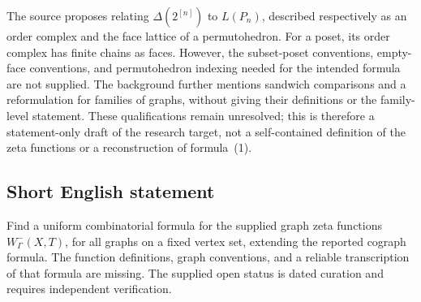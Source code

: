 \documentclass[11pt]{article}
\begin{document}
The source proposes relating \(\Delta(2^{[n]})\) to \(L(P_n)\), described respectively as an order complex and the face lattice of a permutohedron. For a poset, its order complex has finite chains as faces. However, the subset-poset conventions, empty-face conventions, and permutohedron indexing needed for the intended formula are not supplied. The background further mentions sandwich comparisons and a reformulation for families of graphs, without giving their definitions or the family-level statement. These qualifications remain unresolved; this is therefore a statement-only draft of the research target, not a self-contained definition of the zeta functions or a reconstruction of formula~(1).
\subsection{Short English statement}
Find a uniform combinatorial formula for the supplied graph zeta functions \(W^-_\Gamma(X,T)\), for all graphs on a fixed vertex set, extending the reported cograph formula. The function definitions, graph conventions, and a reliable transcription of that formula are missing. The supplied open status is dated curation and requires independent verification.
\end{document}
